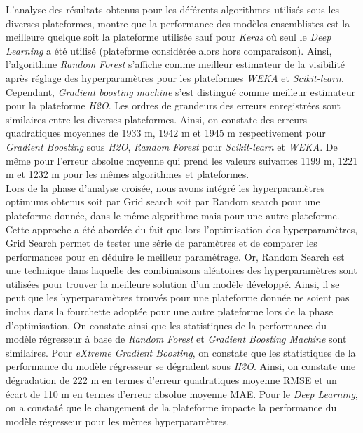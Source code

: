 L’analyse des résultats obtenus pour les déférents algorithmes utilisés sous les diverses plateformes, montre que la performance des modèles ensemblistes est la meilleure quelque soit la plateforme utilisée sauf pour \textit{Keras} où seul le \textit{Deep Learning} a été utilisé (plateforme considérée alors hors comparaison).  Ainsi, l’algorithme \textit{Random Forest} s’affiche comme meilleur estimateur de la visibilité après réglage des hyperparamètres pour les plateformes \textit{WEKA} et \textit{Scikit-learn}. Cependant, \textit{Gradient boosting machine} s’est distingué comme meilleur estimateur pour la plateforme \textit{H2O}. Les ordres de grandeurs des erreurs enregistrées sont similaires entre les diverses plateformes. Ainsi, on constate des erreurs quadratiques moyennes de 1933 m, 1942 m et 1945 m respectivement pour \textit{Gradient Boosting} sous \textit{H2O}, \textit{Random Forest} pour\textit{ Scikit-learn} et \textit{WEKA}. De même pour l’erreur absolue moyenne qui prend les valeurs suivantes 1199 m, 1221 m et 1232 m pour les mêmes algorithmes et plateformes.\\

Lors de la phase d'analyse croisée, nous  avons intégré  les hyperparamètres optimums obtenus soit par Grid search soit par Random search pour une plateforme donnée, dans le même algorithme mais pour une autre plateforme. Cette  approche  a  été  abordée  du  fait  que  lors  l’optimisation  des hyperparamètres, Grid Search permet de tester une série de paramètres et de comparer les performances pour en déduire le meilleur paramétrage. Or, Random Search est  une  technique  dans  laquelle  des  combinaisons  aléatoires  des hyperparamètres sont utilisées pour trouver la meilleure solution d’un modèle développé. Ainsi, il se peut que les hyperparamètres trouvés pour une plateforme donnée  ne  soient  pas  inclus  dans  la  fourchette  adoptée  pour  une  autre plateforme lors de la phase d’optimisation. On constate ainsi que les statistiques de la performance du modèle régresseur à base de \textit{Random Forest} et \textit{Gradient Boosting Machine} sont similaires. Pour \textit{eXtreme Gradient Boosting}, on constate que les statistiques de la performance du modèle régresseur se dégradent sous \textit{H2O}. Ainsi, on constate une dégradation de 222 m
en termes d’erreur quadratiques moyenne RMSE et un écart de 110 m en termes d’erreur absolue moyenne MAE. Pour le \textit{Deep Learning}, on a constaté que le changement de la plateforme impacte la performance du modèle régresseur pour les mêmes hyperparamètres.\\

